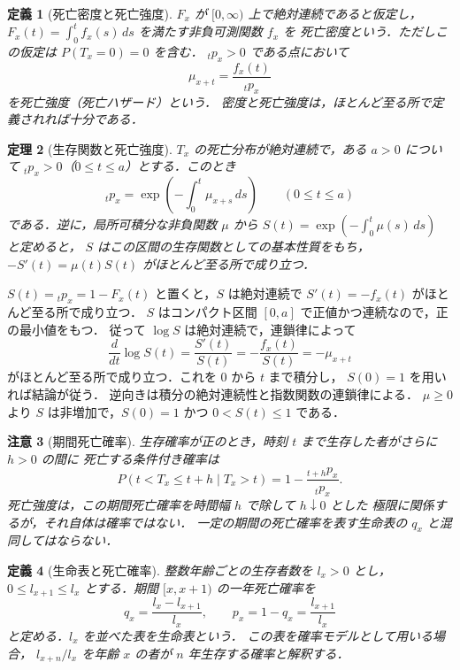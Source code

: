 \documentclass[a5paper,10pt,onecolumn]{jsarticle}
\makeatletter
\theoremstyle{mathnotetheorem}
\newtheorem{theorem}{定理}[section]
\newtheorem{definition}[theorem]{定義}
\newtheorem{remark}[theorem]{注意}
\renewcommand{\proofname}{証明}
\renewenvironment{proof}[1][\proofname]{%
  \par\pushQED{\qed}\normalfont\topsep4\p@\@plus2\p@\relax
  \trivlist\item[\hskip\labelsep\bfseries #1]\ignorespaces
}{\popQED\endtrivlist\@endpefalse}
\makeatother
\begin{document}
\begin{definition}[死亡密度と死亡強度]
$F_x$ が $[0,\infty)$ 上で絶対連続であると仮定し，
$F_x(t)=\int_0^t f_x(s)\,ds$ を満たす非負可測関数 $f_x$ を
\emph{死亡密度}という．ただしこの仮定は $P(T_x=0)=0$ を含む．
${}_tp_x>0$ である点において
\[
 \mu_{x+t}=\frac{f_x(t)}{{}_tp_x}
\]
を\emph{死亡強度}（死亡ハザード）という．
密度と死亡強度は，ほとんど至る所で定義されれば十分である．
\end{definition}

\begin{theorem}[生存関数と死亡強度]\label{thm:hazard}
$T_x$ の死亡分布が絶対連続で，ある $a>0$ について
${}_tp_x>0$（$0\le t\le a$）とする．このとき
\[
 {}_tp_x=\exp\left(-\int_0^t\mu_{x+s}\,ds\right)
 \qquad(0\le t\le a)
\]
である．逆に，局所可積分な非負関数 $\mu$ から
$S(t)=\exp(-\int_0^t\mu(s)\,ds)$ と定めると，
$S$ はこの区間の生存関数としての基本性質をもち，
$-S'(t)=\mu(t)S(t)$ がほとんど至る所で成り立つ．
\end{theorem}
\begin{proof}
$S(t)={}_tp_x=1-F_x(t)$ と置くと，$S$ は絶対連続で
$S'(t)=-f_x(t)$ がほとんど至る所で成り立つ．
$S$ はコンパクト区間 $[0,a]$ で正値かつ連続なので，正の最小値をもつ．
従って $\log S$ は絶対連続で，連鎖律によって
\[
 \frac{d}{dt}\log S(t)=\frac{S'(t)}{S(t)}
 =-\frac{f_x(t)}{S(t)}=-\mu_{x+t}
\]
がほとんど至る所で成り立つ．これを $0$ から $t$ まで積分し，
$S(0)=1$ を用いれば結論が従う．
逆向きは積分の絶対連続性と指数関数の連鎖律による．
$\mu\ge0$ より $S$ は非増加で，$S(0)=1$ かつ $0<S(t)\le1$ である．
\end{proof}

\begin{remark}[期間死亡確率]
生存確率が正のとき，時刻 $t$ まで生存した者がさらに $h>0$ の間に
死亡する条件付き確率は
\[
 P(t<T_x\le t+h\mid T_x>t)
 =1-\frac{{}_{t+h}p_x}{{}_tp_x}.
\]
死亡強度は，この期間死亡確率を時間幅 $h$ で除して $h\downarrow0$ とした
極限に関係するが，それ自体は確率ではない．
一定の期間の死亡確率を表す生命表の $q_x$ と混同してはならない．
\end{remark}

\begin{definition}[生命表と死亡確率]
整数年齢ごとの生存者数を $l_x>0$ とし，
$0\le l_{x+1}\le l_x$ とする．期間 $[x,x+1)$ の\emph{一年死亡確率}を
\[
 q_x=\frac{l_x-l_{x+1}}{l_x},\qquad
 p_x=1-q_x=\frac{l_{x+1}}{l_x}
\]
と定める．$l_x$ を並べた表を\emph{生命表}という．
この表を確率モデルとして用いる場合，
$l_{x+n}/l_x$ を年齢 $x$ の者が $n$ 年生存する確率と解釈する．
\end{definition}
\end{document}

